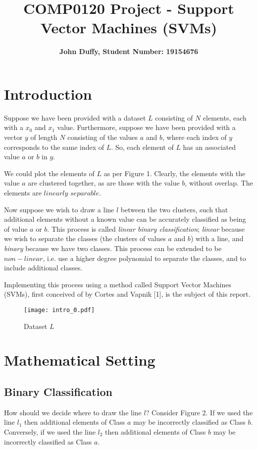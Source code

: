 \documentclass[10pt, a4paper]{amsart}
\title{COMP0120 Project - Support Vector Machines (SVM\MakeLowercase{s})}
\author{\textbf{John Duffy, Student Number: 19154676}}
\begin{document}
\maketitle

\section{Introduction}

Suppose we have been provided with a dataset $L$ consisting of $N$ elements, each with a $x_0$ and $x_1$ value. Furthermore, suppose we have been provided with a vector $y$ of length $N$ consisting of the values $a$ and $b$, where each index of $y$ corresponds to the same index of $L$. So, each element of $L$ has an associated value $a$ or $b$ in $y$.

We could plot the elements of $L$ as per Figure 1. Clearly, the elements with the value $a$ are clustered together, as are those with the value $b$, without overlap. The elements are $linearly$  $separable$.

Now suppose we wish to draw a line $l$ between the two clusters, such that additional elements without a known value can be accurately classified as being of value $a$ or $b$. This process is called \emph{linear binary classification}; \emph{linear} because we wish to separate the classes (the clusters of values $a$ and $b$) with a line, and \emph{binary} because we have two classes. This process can be extended to be $non-linear$, i.e. use a higher degree polynomial to separate the classes, and to include additional classes.  

Implementing this process using a method called Support Vector Machines (SVMs), first conceived of by Cortes and Vapnik [1], is the subject of this report.

\begin{figure}
	\centering	
	\texttt{[image: intro\_0.pdf]}
	\caption{Dataset $L$}
\end{figure}

\section{Mathematical Setting}

\subsection{Binary Classification}

How should we decide where to draw the line $l$? Consider Figure 2. If we used the line $l_1$ then additional elements of Class $a$ may be incorrectly classified as Class $b$. Conversely, if we used the line $l_2$ then additional elements of Class $b$ may be incorrectly classified as Class $a$.
\end{document}
